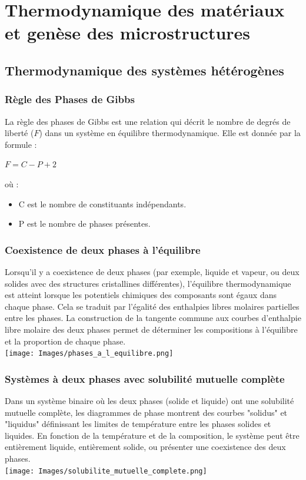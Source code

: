 \documentclass{article}
\begin{document}
\section{Thermodynamique des matériaux et genèse des microstructures}
    \subsection{Thermodynamique des systèmes hétérogènes}
        \subsubsection{Règle des Phases de Gibbs}
        La règle des phases de Gibbs est une relation qui décrit le nombre de degrés de liberté ($F$) dans un système en équilibre thermodynamique. Elle est donnée par la formule :
        \begin{center}
            $F=C-P+2$
        \end{center}
        où :
        \begin{itemize}
            \item C est le nombre de constituants indépendants.
            \item P est le nombre de phases présentes.
        \end{itemize}
    
        \subsubsection{Coexistence de deux phases à l'équilibre}
        Lorsqu'il y a coexistence de deux phases (par exemple, liquide et vapeur, ou deux solides avec des structures cristallines différentes), l'équilibre thermodynamique est atteint lorsque les potentiels chimiques des composants sont égaux dans chaque phase. Cela se traduit par l'égalité des enthalpies libres molaires partielles entre les phases. La construction de la tangente commune aux courbes d'enthalpie libre molaire des deux phases permet de déterminer les compositions à l'équilibre et la proportion de chaque phase. \\
            \texttt{[image: Images/phases\_a\_l\_equilibre.png]}
    
        \subsubsection{Systèmes à deux phases avec solubilité mutuelle complète}
        Dans un système binaire où les deux phases (solide et liquide) ont une solubilité mutuelle complète, les diagrammes de phase montrent des courbes "solidus" et "liquidus" définissant les limites de température entre les phases solides et liquides. En fonction de la température et de la composition, le système peut être entièrement liquide, entièrement solide, ou présenter une coexistence des deux phases. \\
            \texttt{[image: Images/solubilite\_mutuelle\_complete.png]}
    
\end{document}
